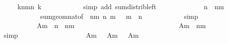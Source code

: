 \begin{isabellebody}
\ {\isachardoublequoteopen}{\isachardot}{\isachardot}{\isachardot}\ {\isacharequal}\ {}\ {\isacharasterisk}\ {\isacharparenleft}{\isasymSum}k{\isasymin}{\isacharbraceleft}n{\isacharminus}m{\isacharplus}{}{\isachardot}{\isachardot}{\isacharless}n{\isacharbraceright}{\isachardot}\ {}{\isacharcircum}k{\isacharparenright}{\isachardoublequoteclose}\isanewline
\ \ \ \ \ \ \ \ \ \ \isamarkupfalse%
\ {\isacharparenleft}simp\ add{\isacharcolon}\ sum{\isacharunderscore}distrib{\isacharunderscore}left{\isacharparenright}\isanewline
\ \ \ \ \ \ \ \ \isamarkupfalse%
\ \isamarkupfalse%
\ {\isachardoublequoteopen}{\isachardot}{\isachardot}{\isachardot}\ {\isacharequal}\ {}{\isacharcircum}n\ {\isacharminus}\ {}{\isacharcircum}{\isacharparenleft}n{\isacharminus}m{\isacharplus}{}{\isacharparenright}{\isachardoublequoteclose}\isanewline
\ \ \ \ \ \ \ \ \ \ \isamarkupfalse%
\ sum{\isacharunderscore}geom{\isacharunderscore}nat{\isacharprime}{\isacharbrackleft}of\ {}\ {\isachardoublequoteopen}n{\isacharminus}m{\isacharplus}{}{\isachardoublequoteclose}\ n{\isacharbrackright}\ {\isacharbackquoteopen}m\ {\isasymge}\ {}{\isacharbackquoteclose}\ {\isacharbackquoteopen}m\ {\isasymle}\ n{\isacharbackquoteclose}\isanewline
\ \ \ \ \ \ \ \ \ \ \isamarkupfalse%
\ simp\isanewline
\ \ \ \ \ \ \ \ \isamarkupfalse%
\isanewline
\ \ \ \ \ \ \ \ \isamarkupfalse%
\ {\isachardoublequoteopen}{\isasymSum}\ {\isacharquery}Am{\isacharprime}\ {\isacharequal}\ {}{\isacharcircum}n\ {\isacharminus}\ {}{\isacharcircum}{\isacharparenleft}n{\isacharminus}m{\isacharplus}{}{\isacharparenright}{\isachardoublequoteclose}\isanewline
\ \ \ \ \ \ \ \ \ \ \isacommand{{\isachardot}}\isamarkupfalse%
\isanewline
\isanewline
\ \ \ \ \ \ \ \ \isamarkupfalse%
\isanewline
\isanewline
\ \ \ \ \ \ \ \ \isamarkupfalse%
\ {\isachardoublequoteopen}{\isasymSum}\ {\isacharquery}Am{\isacharprime}{\isacharprime}\ {\isacharequal}\ {}{\isacharcircum}{\isacharparenleft}n{\isacharminus}m{\isacharplus}{}{\isacharparenright}{\isachardoublequoteclose}\isanewline
\ \ \ \ \ \ \ \ \ \ \isamarkupfalse%
\ simp\isanewline
\isanewline
\ \ \ \ \ \ \ \ \isamarkupfalse%
\isanewline
\isanewline
\ \ \ \ \ \ \ \ \isamarkupfalse%
\ {\isachardoublequoteopen}{\isasymSum}\ {\isacharquery}Am\ {\isacharequal}\ {\isasymSum}\ {\isacharquery}Am{\isacharprime}\ {\isacharplus}\ {\isasymSum}\ {\isacharquery}Am{\isacharprime}{\isacharprime}{\isachardoublequoteclose}\isanewline

\end{isabellebody}

